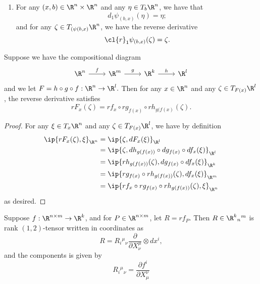 \begin{enumerate}
\begin{enumerate}
		\item For any $(x,b)\in\R^n\times\R^n$ and any $\eta\in T_b\R^n$, we have that
		$$d_1\psi_{(b,x)}(\eta)=\eta;$$
		and for any $\zeta\in T_{(\psi(b,x)}\R^n$, we have the reverse derivative
		$$\cl{r}_1\psi_{(b,x)}(\zeta)=\zeta.$$
	\end{enumerate}
\end{enumerate}


\begin{prop}
	Suppose we have the compositional diagram
	\begin{equation*}
		\begin{tikzcd}
			\R^n
			\arrow[r, "f"]
			&\R^m
			\arrow[r, "g"]
			&\R^k
			\arrow[r, "h"]
			&\R^l
		\end{tikzcd}
	\end{equation*}
	and we let $F=h\circ g\circ f:\R^n\to\R^l.$
	Then for any $x\in\R^n$ and any $\zeta\in T_{F(x)}\R^l$, the reverse derivative satisfies
	$$rF_x(\zeta)=rf_x\circ rg_{f(x)}\circ rh_{g(f(x)}(\zeta).$$
\end{prop}

\begin{proof}
For any $\xi\in T_x\R^n$ and any $\zeta\in T_{F(x)}\R^l$, we have by definition
\begin{align*}
	\ip{rF_x(\zeta),\xi}_{\R^n}&=\ip{\zeta,dF_x(\xi)}_{\R^l}\\
	&=\ip{\zeta,dh_{g(f(x))}\circ dg_{f(x)}\circ df_x(\xi)}_{\R^l}\\
	&=\ip{rh_{g(f(x))}(\zeta),dg_{f(x)}\circ df_x(\xi)}_{\R^k}\\
	&=\ip{rg_{f(x)}\circ rh_{g(f(x))}(\zeta),df_x(\xi)}_{\R^m}\\
	&=\ip{rf_x\circ rg_{f(x)}\circ rh_{g(f(x))}(\zeta),\xi}_{\R^n}
\end{align*}	
as desired.
\end{proof}

\begin{lem}
	Suppose $f:\R^{n\times m}\to\R^k$, and for $P\in\R^{n\times m}$, let $R=rf_P$.  Then $R\in\R^k{_n}{^m}$ is rank $(1,2)$-tensor written in coordinates as
	$$R=R_i{^\mu}{_\nu}\frac{\partial}{\partial X^\mu_\nu}\otimes dx^i,$$
	and the components is given by
	$$R_i{^\mu}{_\nu}=\frac{\partial f^i}{\partial X^\nu_\mu}$$
\end{lem}

